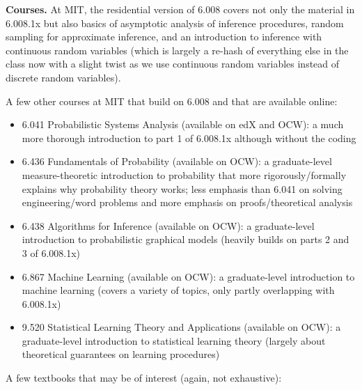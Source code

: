 \textbf{Courses.} At MIT, the residential version of 6.008 covers not only the material in 6.008.1x but also basics of asymptotic analysis of inference procedures, random sampling for approximate inference, and an introduction to inference with continuous random variables (which is largely a re-hash of everything else in the class now with a slight twist as we use continuous random variables instead of discrete random variables).

A few other courses at MIT that build on 6.008 and that are available online:

\begin{itemize}
\item 6.041 Probabilistic Systems Analysis (available on edX and OCW): a much more thorough introduction to part 1 of 6.008.1x although without the coding

\item 6.436 Fundamentals of Probability (available on OCW): a graduate-level measure-theoretic introduction to probability that more rigorously/formally explains why probability theory works; less emphasis than 6.041 on solving engineering/word problems and more emphasis on proofs/theoretical analysis

\item 6.438 Algorithms for Inference (available on OCW): a graduate-level introduction to probabilistic graphical models (heavily builds on parts 2 and 3 of 6.008.1x)

\item 6.867 Machine Learning (available on OCW): a graduate-level introduction to machine learning (covers a variety of topics, only partly overlapping with 6.008.1x)

\item 9.520 Statistical Learning Theory and Applications (available on OCW): a graduate-level introduction to statistical learning theory (largely about theoretical guarantees on learning procedures)
\end{itemize}

A few textbooks that may be of interest (again, not exhaustive):


